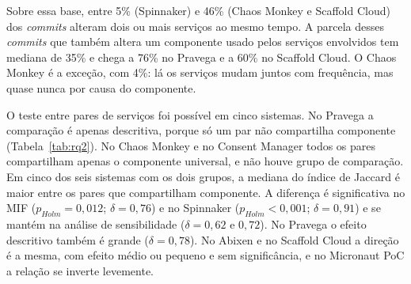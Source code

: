 Sobre essa base, entre 5\% (Spinnaker) e 46\% (Chaos Monkey e Scaffold Cloud) dos \textit{commits} alteram dois ou mais serviços ao mesmo tempo. A parcela desses \textit{commits} que também altera um componente usado pelos serviços envolvidos tem mediana de 35\% e chega a 76\% no Pravega e a 60\% no Scaffold Cloud. O Chaos Monkey é a exceção, com 4\%: lá os serviços mudam juntos com frequência, mas quase nunca por causa do componente.

O teste entre pares de serviços foi possível em cinco sistemas. No Pravega a comparação é apenas descritiva, porque só um par não compartilha componente (Tabela~\ref{tab:rq2}). No Chaos Monkey e no Consent Manager todos os pares compartilham apenas o componente universal, e não houve grupo de comparação. Em cinco dos seis sistemas com os dois grupos, a mediana do índice de Jaccard é maior entre os pares que compartilham componente. A diferença é significativa no MIF ($p_{Holm} = 0{,}012$; $\delta = 0{,}76$) e no Spinnaker ($p_{Holm} < 0{,}001$; $\delta = 0{,}91$) e se mantém na análise de sensibilidade ($\delta = 0{,}62$ e $0{,}72$). No Pravega o efeito descritivo também é grande ($\delta = 0{,}78$). No Abixen e no Scaffold Cloud a direção é a mesma, com efeito médio ou pequeno e sem significância, e no Micronaut PoC a relação se inverte levemente.

\begin{table}[htbp]
\centering
{}
\end{table}

